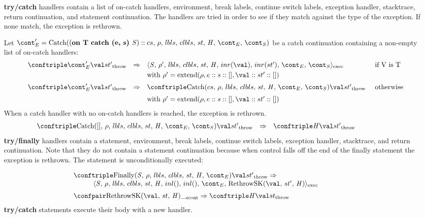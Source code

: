 \documentclass{article}
\DeclareMathOperator{\extend}{extend}
\begin{document}
\noindent
\textbf{try/catch} handlers contain a list of on-catch handlers, environment, break labels, continue switch labels, exception handler, stacktrace, return continuation, and statement continuation.
The handlers are tried in order to see if they match against the type of the exception.
If none match, the exception is rethrown.

\noindent
Let $\econt' = \CatchH{(\textbf{on T catch (e, s) }\stmt) :: cs}$ be a catch continuation containing a non-empty list of on-catch handlers:
\[
  \begin{array}{lcll}
	\throwconf{\econt'}{\val}{\strace'}
	& \Rightarrow &
	\execconf{\stmt}{\env'}{\lbls}{\clbls}{\handler}{inr(\val)}{inr(\strace')}{\econt}{\scont}
	&\textrm{ if V is T}\\[1mm]

	&&\textrm{with } \env' = \extend(\env, e :: s :: [], \val :: \strace' :: [])\\[2mm]

	\throwconf{\econt'}{\val}{\strace'}
	& \Rightarrow &
	\throwconf{\CatchH{cs}}{\val}{\strace'}	&\textrm{ otherwise}\\[2mm]
	&&\textrm{with } \env' = \extend(\env, e :: s :: [], \val :: \strace' :: [])
  \end{array}
\]
\noindent
When a catch handler with no on-catch handlers is reached, the exception is rethrown.
\[
  \begin{array}{lcll}
	\throwconf{\CatchH{[]}}{\val}{\strace'}
	& \Rightarrow &
	\throwconf{\handler}{\val}{\strace'}\hspace{20mm}
  \end{array}
\]
\noindent
\textbf{try/finally} handlers contain a statement, environment, break labels, continue switch labels, exception handler, stacktrace, and return continuation.
Note that they do not contain a statement continuation because when control falls off the end of the finally statement the exception is rethrown.
The statement is unconditionally executed:

\[
  \begin{array}{lcl}
	\throwconf{\FinallyK{\stmt}}{\val}{\strace'}
	\Rightarrow \\
	\hspace{10mm}\execconf{\stmt}{\env}{\lbls}{\clbls}{\handler}{inl()}{inl()}{\econt}{\RethrowSK{\val}{\strace'}{\handler}}\hspace{20mm}\\[2mm]

	\scontconf{\RethrowSK{\val}{\strace}{\handler}}{\_}
	\Rightarrow \throwconf{\handler}{\val}{\strace}

  \end{array}
\]
\noindent
\textbf{try/catch} statements execute their body with a new handler.
\end{document}
